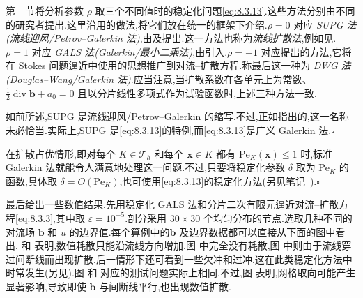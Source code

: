 第~~节将分析参数 \(\rho\) 取三个不同值时的稳定化问题\eqref{eq:8.3.13}.这些方法分别由不同的研究者提出.这里沿用的做法,将它们放在统一的框架下介绍.\(\rho=0\) 对应 \emph{SUPG 法(流线迎风/Petrov--Galerkin 法)},由及提出.这一方法也称为\emph{流线扩散法},例如见.\(\rho=1\) 对应 \emph{GALS 法(Galerkin/最小二乘法)},由引入.\(\rho=-1\) 对应提出的方法,它将在 Stokes 问题逼近中使用的思想推广到对流--扩散方程.称最后这一种为 \emph{DWG 法(Douglas--Wang/Galerkin 法)}.应当注意,当扩散系数在各单元上为常数、\(\tfrac12\operatorname{div}\boldsymbol{b}+a_0=0\) 且以分片线性多项式作为试验函数时,上述三种方法一致.

\begin{note}
如前所述,SUPG 是流线迎风/Petrov--Galerkin 的缩写.不过,正如指出的,这一名称未必恰当.实际上,SUPG 是\eqref{eq:8.3.13}的特例,而\eqref{eq:8.3.13}是广义 Galerkin 法.\hfill\(\square\)
\end{note}

\begin{note}
在{\heiti 扩散占优情形},即对每个 \(K\in\mathcal T_h\) 和每个 \(\boldsymbol{x}\in K\) 都有 \(\mathrm{Pe}_K(\boldsymbol{x})\le1\) 时,标准 Galerkin 法就能令人满意地处理这一问题.不过,只要将稳定化参数 \(\delta\) 取为 \(\mathrm{Pe}_K\) 的函数,具体取 \(\delta=O(\mathrm{Pe}_K)\),也可使用\eqref{eq:8.3.13}的稳定化方法(另见笔记~).\hfill\(\square\)
\end{note}

最后给出一些数值结果.先用稳定化 GALS 法和分片二次有限元逼近对流--扩散方程\eqref{eq:8.3.3},其中取 \(\varepsilon=10^{-5}\).剖分采用 \(30\times30\) 个均匀分布的节点.选取几种不同的对流场 \(\boldsymbol{b}\) 和 \(u\) 的边界值.每个算例中的\(\boldsymbol{b}\) 及边界数据都可以直接从下面的图中看出. 和  表明,数值耗散只能沿流线方向增加.图  中完全没有耗散,图  中则由于流线穿过间断线而出现扩散.后一情形下还可看到一些欠冲和过冲,这在此类稳定化方法中时常发生(另见).图  和  对应的测试问题实际上相同.不过,图  表明,网格取向可能产生显著影响,导致即使 \(\boldsymbol{b}\) 与间断线平行,也出现数值扩散.

